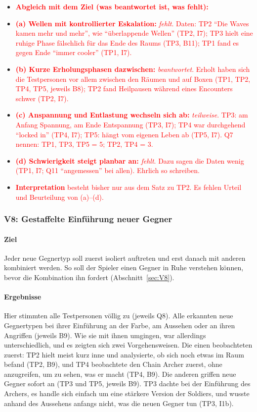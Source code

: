 \documentclass[../Main.tex]{subfiles}
\begin{document}
\begin{itemize}[leftmargin=1.5cm]
    \item \textcolor{red}{\textbf{Abgleich mit dem Ziel (was beantwortet ist, was fehlt):}}
    \item \textcolor{red}{\textbf{(a) Wellen mit kontrollierter Eskalation:} \emph{fehlt}. Daten: TP2 \enquote{Die Waves kamen mehr und mehr}, wie \enquote{überlappende Wellen} (TP2, I7); TP3 hielt eine ruhige Phase fälschlich für das Ende des Raums (TP3, B11); TP1 fand es gegen Ende \enquote{immer cooler} (TP1, I7).}
    \item \textcolor{red}{\textbf{(b) Kurze Erholungsphasen dazwischen:} \emph{beantwortet}. Erholt haben sich die Testpersonen vor allem zwischen den Räumen und auf Boxen (TP1, TP2, TP4, TP5, jeweils B8); TP2 fand Heilpausen während eines Encounters schwer (TP2, I7).}
    \item \textcolor{red}{\textbf{(c) Anspannung und Entlastung wechseln sich ab:} \emph{teilweise}. TP3: am Anfang Spannung, am Ende Entspannung (TP3, I7); TP4 war durchgehend \enquote{locked in} (TP4, I7); TP5: hängt vom eigenen Leben ab (TP5, I7). Q7 nennen: TP1, TP3, TP5 = 5; TP2, TP4 = 3.}
    \item \textcolor{red}{\textbf{(d) Schwierigkeit steigt planbar an:} \emph{fehlt}. Dazu sagen die Daten wenig (TP1, I7; Q11 \enquote{angemessen} bei allen). Ehrlich so schreiben.}
    \item \textcolor{red}{\textbf{Interpretation} besteht bisher nur aus dem Satz zu TP2. Es fehlen Urteil und Beurteilung von (a)--(d).}
\end{itemize}

\subsubsection{V8: Gestaffelte Einführung neuer Gegner}

\paragraph{Ziel}
Jeder neue Gegnertyp soll zuerst isoliert auftreten und erst danach mit anderen kombiniert werden. So soll der Spieler einen Gegner in Ruhe verstehen können, bevor die Kombination ihn fordert (Abschnitt~\ref{sec:V8}).

\paragraph{Ergebnisse}
Hier stimmten alle Testpersonen völlig zu (jeweils Q8). Alle erkannten neue Gegnertypen bei ihrer Einführung an der Farbe, am Aussehen oder an ihren Angriffen (jeweils B9). Wie sie mit ihnen umgingen, war allerdings unterschiedlich, und es zeigten sich zwei Vorgehensweisen. Die einen beobachteten zuerst: TP2 hielt meist kurz inne und analysierte, ob sich noch etwas im Raum befand (TP2, B9), und TP4 beobachtete den Chain Archer zuerst, ohne anzugreifen, um zu sehen, was er macht (TP4, B9). Die anderen griffen neue Gegner sofort an (TP3 und TP5, jeweils B9). TP3 dachte bei der Einführung des Archers, es handle sich einfach um eine stärkere Version der Soldiers, und wusste anhand des Aussehens anfangs nicht, was die neuen Gegner tun (TP3, I1b).
\end{document}
